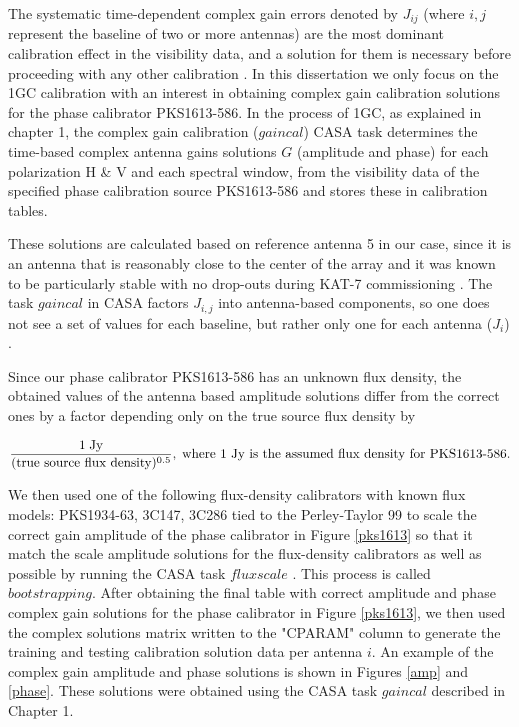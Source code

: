 The systematic time-dependent complex gain errors denoted by $J_{ij}$ (where $i,j$ represent the baseline of two or more antennas) are the most dominant calibration effect in the visibility data, and a solution for them is necessary before proceeding with any other calibration \citep{ott2013casa}. In this dissertation we only focus on the 1GC calibration with an interest in obtaining complex gain calibration solutions for the phase calibrator PKS1613-586. In the process of 1GC, as explained in chapter 1, the complex gain calibration ($\textit{gaincal}$)  CASA task determines the time-based complex antenna gains solutions $G$ (amplitude and phase) for each polarization H \& V and each spectral window, from the visibility data of the specified phase calibration source PKS1613-586 and stores these in calibration tables.
 
These solutions are calculated based on reference antenna 5 in our case, since it is an antenna that is reasonably close to the center of the array and it was known to be particularly stable with no drop-outs during KAT-7 commissioning \citep{ott2013casa}. The task $\textit{gaincal}$ in CASA factors $J_{i,j}$ into antenna-based components, so one does not see a set of values for each baseline, but rather only one for each antenna ($J_i$) \citep{editioncasa}. 

Since our phase calibrator PKS1613-586 has an unknown flux density, the obtained values of the antenna based amplitude solutions differ from the correct ones by a factor depending only on the true source flux density by 

\begin{equation}
\frac{1\;\mathrm{Jy}}{(\text{true source flux density})^{0.5}},\;  \text{where 1 $\mathrm{Jy}$ is the assumed flux density for \text{PKS1613-586}}.
\end{equation} 

We then used one of the following flux-density calibrators with known flux models: PKS1934-63, 3C147, 3C286 tied to the Perley-Taylor 99 to scale the correct gain amplitude of the phase calibrator in Figure \ref{pks1613} so that it match the scale amplitude solutions for the flux-density calibrators as well as possible by running the CASA task $\textit{fluxscale}$ \citep{editioncasa}. This process is called $\textit{bootstrapping}$. After obtaining the final table with correct amplitude and phase complex gain solutions for the phase calibrator in Figure \ref{pks1613}, we then used the complex solutions matrix written to the "CPARAM" column to generate the training and testing calibration solution data per antenna $i$. An example of the complex gain amplitude and phase solutions is shown in Figures \ref{amp} and \ref{phase}. These solutions were obtained using the CASA task $gaincal$ described in Chapter 1. 

